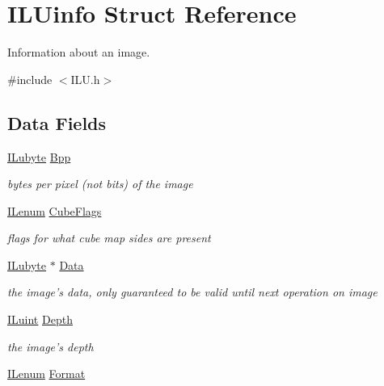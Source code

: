 \hypertarget{struct_i_l_uinfo}{\section{I\+L\+Uinfo Struct Reference}
\label{struct_i_l_uinfo}
}


Information about an image.  




{\ttfamily \#include $<$I\+L\+U.\+h$>$}

\subsection*{Data Fields}
\begin{DoxyCompactItemize}
\item 
\hyperlink{group__il__types_ga057357939bc5a12e8061715453568519}{I\+Lubyte} \hyperlink{struct_i_l_uinfo_acb619433784a0e26c0f1f18b3700c9f7}{Bpp}
\begin{DoxyCompactList}\small\item\em bytes per pixel (not bits) of the image \end{DoxyCompactList}\item 
\hyperlink{group__il__types_ga62ca73445716183ef42b1f3906a45ed0}{I\+Lenum} \hyperlink{struct_i_l_uinfo_a2141dcf3ce36303a8c31d417d9337034}{Cube\+Flags}
\begin{DoxyCompactList}\small\item\em flags for what cube map sides are present \end{DoxyCompactList}\item 
\hyperlink{group__il__types_ga057357939bc5a12e8061715453568519}{I\+Lubyte} $\ast$ \hyperlink{struct_i_l_uinfo_a32fd28ac5d89e3ef2f9151330af0149d}{Data}
\begin{DoxyCompactList}\small\item\em the image's data, only guaranteed to be valid until next operation on image \end{DoxyCompactList}\item 
\hyperlink{group__il__types_gaff8e86a1072c8d7cfe387fb87c6ed8e1}{I\+Luint} \hyperlink{struct_i_l_uinfo_a2a4c47a9713bee335a0830b336bdc951}{Depth}
\begin{DoxyCompactList}\small\item\em the image's depth \end{DoxyCompactList}\item 
\hyperlink{group__il__types_ga62ca73445716183ef42b1f3906a45ed0}{I\+Lenum} \hyperlink{struct_i_l_uinfo_aab6d023e52ab2d90be412df75a42abfb}{Format}

\end{DoxyCompactItemize}
